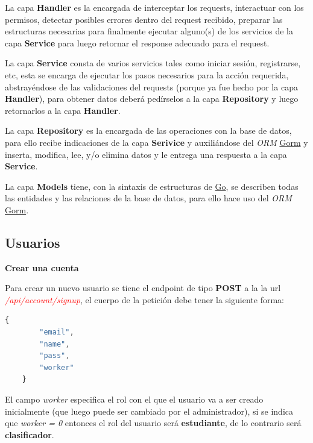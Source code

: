 La capa \textbf{Handler} es la encargada de interceptar los requests, interactuar con los permisos, detectar posibles errores dentro del request recibido, preparar las estructuras necesarias para finalmente ejecutar alguno(s) de los servicios de la capa \textbf{Service} para luego retornar el response adecuado para el request.
\newline

La capa \textbf{Service} consta de varios servicios tales como iniciar sesión, registrarse, etc, esta se encarga de ejecutar los pasos necesarios para la acción requerida, abstrayéndose de las validaciones del requests (porque ya fue hecho por la capa \textbf{Handler}), para obtener datos deberá pedírselos a la capa \textbf{Repository} y luego retornarlos a la capa \textbf{Handler}.
\newline

La capa \textbf{Repository} es la encargada de las operaciones con la base de datos, para ello recibe indicaciones de la capa \textbf{Serivice} y auxiliándose del \textit{ORM} \href{gorm.io}{Gorm} y inserta, modifica, lee, y/o elimina datos y le entrega una respuesta a la capa \textbf{Service}.
\newline

La capa \textbf{Models} tiene, con la sintaxis de estructuras de \href{go.dev}{Go}, se describen todas las entidades y las relaciones de la base de datos, para ello hace uso del \textit{ORM} \href{gorm.io}{Gorm}.

\subsection{Usuarios}

\textbf{Crear una cuenta}

Para crear un nuevo usuario se tiene el endpoint de tipo \textbf{POST} a la la url \textit{\textcolor{red}{/api/account/signup}}, el cuerpo de la petición debe tener la siguiente forma:

\begin{lstlisting}[language=javascript]
	{
		"email",
		"name",
		"pass",
		"worker"
	}
\end{lstlisting}

El campo \textit{worker} especifica el rol con el que el usuario va a ser creado inicialmente (que luego puede ser cambiado por el administrador), si se indica que \textit{worker = 0} entonces el rol del usuario será \textbf{estudiante}, de lo contrario será \textbf{clasificador}.
\newline

